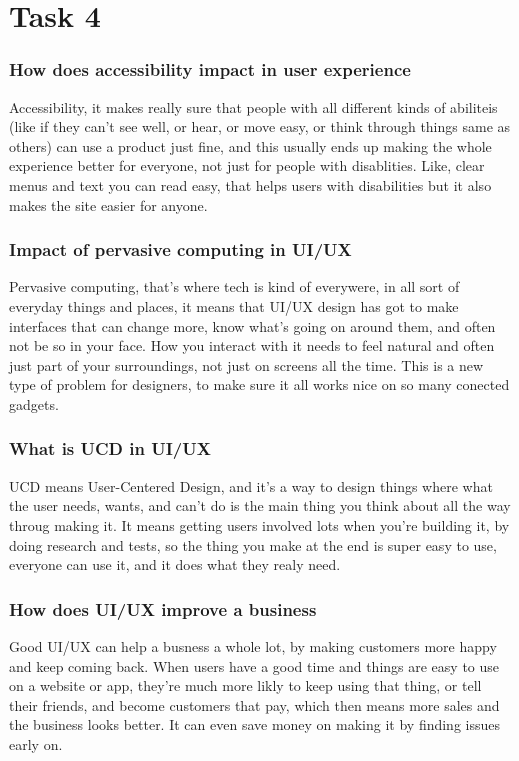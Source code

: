\documentclass[12pt,a4paper]{article}
\begin{document}
\section*{Task 4}

\subsubsection*{How does accessibility impact in user experience}
Accessibility, it makes really sure that people with all different kinds of abiliteis (like if they can't see well, or hear, or move easy, or think through things same as others) can use a product just fine, and this usually ends up making the whole experience better for everyone, not just for people with disablities. Like, clear menus and text you can read easy, that helps users with disabilities but it also makes the site easier for anyone.

\subsubsection*{Impact of pervasive computing in UI/UX}
Pervasive computing, that's where tech is kind of everywere, in all sort of everyday things and places, it means that UI/UX design has got to make interfaces that can change more, know what's going on around them, and often not be so in your face. How you interact with it needs to feel natural and often just part of your surroundings, not just on screens all the time. This is a new type of problem for designers, to make sure it all works nice on so many conected gadgets.

\subsubsection*{What is UCD in UI/UX}
UCD means User-Centered Design, and it's a way to design things where what the user needs, wants, and can't do is the main thing you think about all the way throug making it. It means getting users involved lots when you're building it, by doing research and tests, so the thing you make at the end is super easy to use, everyone can use it, and it does what they realy need.

\subsubsection*{How does UI/UX improve a business}
Good UI/UX can help a busness a whole lot, by making customers more happy and keep coming back. When users have a good time and things are easy to use on a website or app, they're much more likly to keep using that thing, or tell their friends, and become customers that pay, which then means more sales and the business looks better. It can even save money on making it by finding issues early on.
\end{document}
